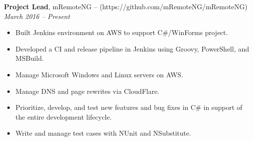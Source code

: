 {\bf Project Lead}, mRemoteNG – (https://github.com/mRemoteNG/mRemoteNG)\\
{\it March 2016 – Present}
\begin{itemize}
	\item Built Jenkins environment on AWS to support C\#/WinForms project.
	\item Developed a CI and release pipeline in Jenkins using Groovy, PowerShell, and MSBuild.
	\item Manage Microsoft Windows and Linux servers on AWS.
	\item Manage DNS and page rewrites via CloudFlare.
	\item Prioritize, develop, and test new features and bug fixes in C\# in support of the entire development lifecycle.
	\item Write and manage test cases with NUnit and NSubstitute.
\end{itemize}